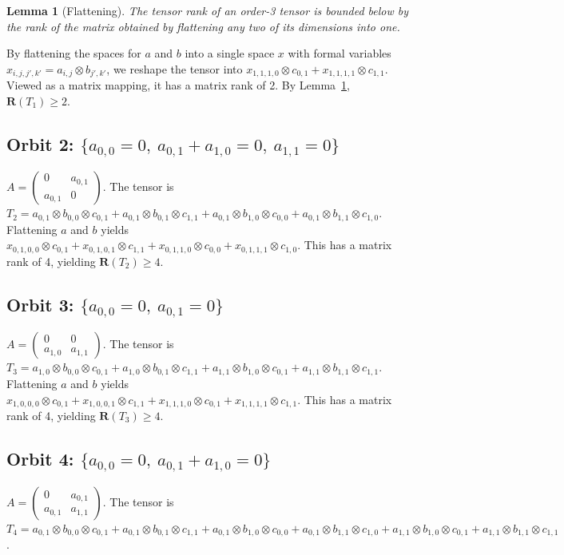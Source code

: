 \documentclass[11pt]{article}
\newtheorem{lemma}{Lemma}
\begin{document}
\begin{lemma}[Flattening]\label{lem:flatten-rank}
  The tensor rank of an order-3 tensor is bounded below by the rank of the matrix obtained by flattening any two of its dimensions into one.
\end{lemma}

By flattening the spaces for $a$ and $b$ into a single space $x$ with formal variables $x_{i,j,j',k'} = a_{i,j} \otimes b_{j',k'}$, we reshape the tensor into $x_{1,1,1,0} \otimes c_{0,1} + x_{1,1,1,1} \otimes c_{1,1}$. Viewed as a matrix mapping, it has a matrix rank of 2. By Lemma~\ref{lem:flatten-rank}, $\mathbf{R} (T_1) \geq 2$.

\subsection*{Orbit 2: $\{a_{0,0}=0,\ a_{0,1}+a_{1,0}=0,\ a_{1,1}=0\}$}
$A=
  \begin{pmatrix}
    0       & a_{0,1} \\
    a_{0,1} & 0
  \end{pmatrix}$.
The tensor is $T_2 = a_{0,1} \otimes b_{0,0} \otimes c_{0,1} + a_{0,1} \otimes b_{0,1} \otimes c_{1,1} + a_{0,1} \otimes b_{1,0} \otimes c_{0,0} + a_{0,1} \otimes b_{1,1} \otimes c_{1,0}$.
Flattening $a$ and $b$ yields $x_{0,1,0,0} \otimes c_{0,1} + x_{0,1,0,1} \otimes c_{1,1} + x_{0,1,1,0} \otimes c_{0,0} + x_{0,1,1,1} \otimes c_{1,0}$. This has a matrix rank of 4, yielding $\mathbf{R} (T_2) \geq 4$.

\subsection*{Orbit 3: $\{a_{0,0}=0,\ a_{0,1}=0\}$}
$A=
  \begin{pmatrix}
    0       & 0       \\
    a_{1,0} & a_{1,1}
  \end{pmatrix}$.
The tensor is $T_3 = a_{1,0} \otimes b_{0,0} \otimes c_{0,1} + a_{1,0} \otimes b_{0,1} \otimes c_{1,1} + a_{1,1} \otimes b_{1,0} \otimes c_{0,1} + a_{1,1} \otimes b_{1,1} \otimes c_{1,1}$.
Flattening $a$ and $b$ yields $x_{1,0,0,0} \otimes c_{0,1} + x_{1,0,0,1} \otimes c_{1,1} + x_{1,1,1,0} \otimes c_{0,1} + x_{1,1,1,1} \otimes c_{1,1}$. This has a matrix rank of 4, yielding $\mathbf{R} (T_3) \geq 4$.

\subsection*{Orbit 4: $\{a_{0,0}=0,\ a_{0,1}+a_{1,0}=0\}$}
$A=
  \begin{pmatrix}
    0       & a_{0,1} \\
    a_{0,1} & a_{1,1}
  \end{pmatrix}$.
The tensor is $T_4 = a_{0,1} \otimes b_{0,0} \otimes c_{0,1} + a_{0,1} \otimes b_{0,1} \otimes c_{1,1} + a_{0,1} \otimes b_{1,0} \otimes c_{0,0} + a_{0,1} \otimes b_{1,1} \otimes c_{1,0} + a_{1,1} \otimes b_{1,0} \otimes c_{0,1} + a_{1,1} \otimes b_{1,1} \otimes c_{1,1}$.
\end{document}
